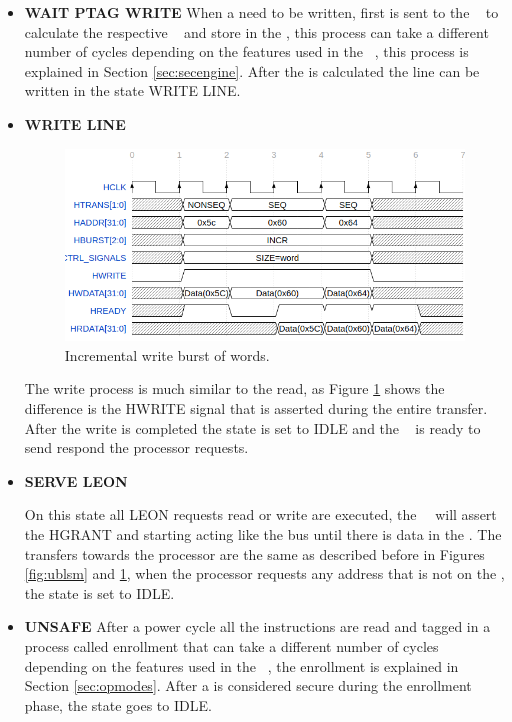 \begin{itemize}
 \item{\textbf{WAIT PTAG WRITE}}
 When a \sline need to be written, first is sent to the \seceng~ to calculate the respective \ptag~ and store in the \ptagmem, this process can take a different number of cycles depending on the features used in the \seceng~, this process is explained in Section \ref{sec:secengine}. After the \ptag is calculated the line can be written in the state WRITE LINE.
 
 
 \item{\textbf{WRITE LINE}}
   \begin{figure}[H]
    \centering
    \includegraphics[width=\textwidth]{figures/others/ahbwrite.png}
    \caption{Incremental write burst of words.}
    \label{fig:ahbwrite}
  \end{figure}
The write process is much similar to the read, as Figure \ref{fig:ahbwrite} shows the difference is the HWRITE signal that is asserted during the entire transfer. After the write is completed the state is set to IDLE and the \handler~ is ready to send respond the processor requests.

 \item{\textbf{SERVE LEON}}

 On this state all LEON requests read or write are executed, the \handler~~will assert the HGRANT and starting acting like the bus until there is data in the \sbuf. The transfers towards the processor are the same as described before in Figures \ref{fig:ublsm} and \ref{fig:ahbwrite}, when the processor requests any address that is not on the \sbuf, the state is set to IDLE.
 
\item{\textbf{UNSAFE}}
After a power cycle all the instructions are read and tagged in a process called enrollment that can take a different number of cycles depending on the features used in the \seceng~, the enrollment is explained in Section \ref{sec:opmodes}. After a \sline is considered secure during the enrollment phase, the state goes to IDLE.
 
\end{itemize}

